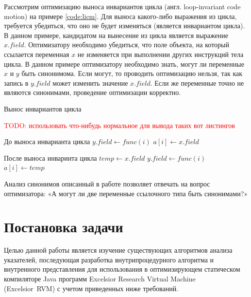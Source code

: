 \documentclass[14pt,titlepage]{extarticle}
\newcommand{\todo}[1]{\textcolor{red}{TODO: #1}}
\newcommand{\eng}[1]{{\English#1}}
\begin{document}
      Рассмотрим оптимизацию выноса инвариантов цикла (англ.
      \eng{loop-invariant code motion}) на примере \ref{code:licm}.
      Для выноса какого-либо выражения из цикла, требуется убедиться, что оно
      не будет изменяться (является инвариантом цикла).
      В данном примере, кандидатом на вынесение из цикла является выражение
      $x.field$. Оптимизатору необходимо убедиться, что поле объекта, на
      который ссылается переменная $x$ не изменяется при выполнении других
      инструкций тела цикла. В данном примере оптимизатору необходимо знать,
      могут ли переменные $x$ и $y$ быть синонимома. Если могут, то
      проводить оптимизацию нельзя, так как запись в $y.field$ может изменить
      значение $x.field$. Если же переменные точно не являются синонимами,
      проведение оптимизации корректно.

      \begin{algorithm}
        \caption{Вынос инвариантов цикла}
        \label{code:licm}
        \todo{использовать что-нибудь нормальное для вывода таких вот
              листингов}
        \begin{algorithmic}[1]
          \REQUIRE До выноса инварианта цикла
          \STATE $y.field \gets func(i)$
          \STATE $a[i] \gets x.field$
          \ENDFOR
        \end{algorithmic}
        \begin{algorithmic}[1]
          \REQUIRE После выноса инваринта цикла
          \STATE $temp \gets x.field$
          \STATE $y.field \gets func(i)$
          \STATE $a[i] \gets temp$
          \ENDFOR
        \end{algorithmic}
      \end{algorithm}

      Анализ синонимов описанный в работе позволяет отвечать на
      вопрос оптимизатора: «А могут ли две переменные ссылочного типа быть
      синонимами?»

  \newpage
  \section{Постановка задачи}

    Целью данной работы является изучение существующих алгоритмов анализа
    указателей, последующая разработка внутрипроцедурного алгоритма и
    внутренного представления для использования в оптимизирующем
    статическом компиляторе Java программ
    \eng{Excelsior Research Virtual Machine (Excelsior~RVM)}
    с учетом приведенных ниже требований.
\end{document}
